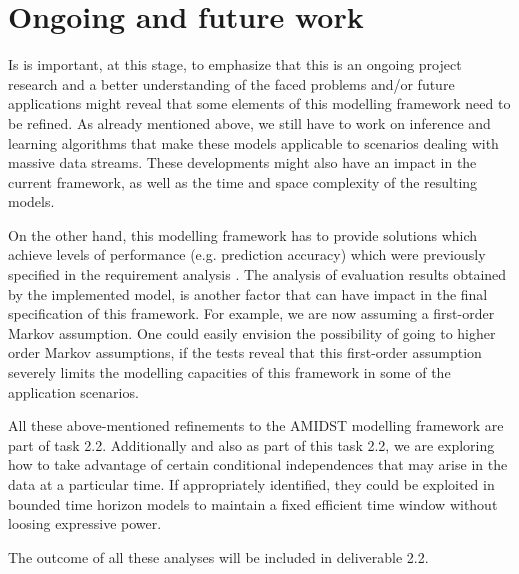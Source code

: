\section{Ongoing and future work}

Is is important, at this stage, to emphasize that this is an ongoing project research and a better understanding of the faced problems and/or future applications might reveal that some elements of this modelling framework need to be refined. As already mentioned above,  we still have to work on inference and learning algorithms that make these models applicable to scenarios dealing with massive data streams. These developments might also have an impact in the current framework, as well as the time and space complexity of the resulting models.

On the other hand, this modelling framework has to provide solutions which achieve levels of performance (e.g. prediction accuracy) which were previously specified in the requirement analysis \cite{Fer14b}.  The analysis of evaluation results obtained by the implemented model, is another factor that can have impact in the final specification of this framework. For example, we are now assuming a first-order Markov assumption. One could easily envision the possibility of going to higher order Markov assumptions, if the tests reveal that this first-order assumption severely limits the modelling capacities of this framework in some of the application scenarios. 

All these above-mentioned refinements to the AMIDST modelling framework are part of task 2.2. Additionally and also as part of this task 2.2, we are exploring how to take advantage of certain conditional independences that may arise in the data at a particular time. If appropriately identified, they could be exploited in bounded time horizon models to maintain a fixed efficient time window without loosing expressive power.

The outcome of all these analyses will be included in deliverable 2.2.
